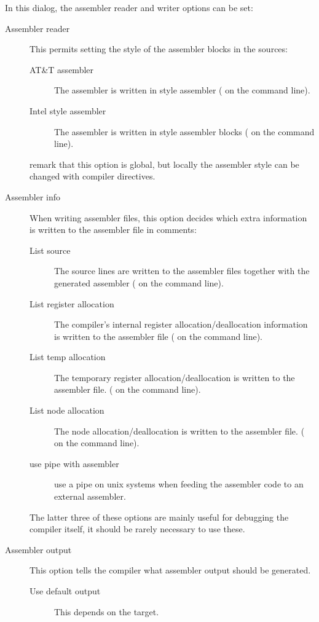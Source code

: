 
In this dialog, the assembler reader and writer options can be set:
\begin{description}
\item[Assembler reader] This permits setting the style of the assembler blocks
in the sources:
\begin{description}
\item[AT\&T assembler] The assembler is written in  style
assembler ( on the command line).
\item[Intel style assembler] The assembler is written in  style
assembler blocks ( on the command line).
\end{description}
remark that this option is global, but locally the assembler style can be
changed with compiler directives.
\item[Assembler info] When writing assembler files, this option decides
which extra information is written to the assembler file in comments:
\begin{description}
\item[List source] The source lines are written to the assembler files
together with the generated assembler ( on the command line).
\item[List register allocation] The compiler's internal register
allocation/deallocation information is written to the assembler file
( on the command line).
\item[List temp allocation] The temporary register allocation/deallocation
is written to the assembler file. ( on the command line).
\item[List node allocation] The node allocation/deallocation
is written to the assembler file. ( on the command line).
\item[use pipe with assembler] use a pipe on unix systems when feeding the
assembler code to an external assembler.
\end{description}
The latter three of these options are mainly useful for debugging the
compiler itself, it should be rarely necessary to use these.
\item[Assembler output] This option tells the compiler what assembler output
should be generated.
\begin{description}
\item[Use default output] This depends on the target.

\end{description}
\end{description}
